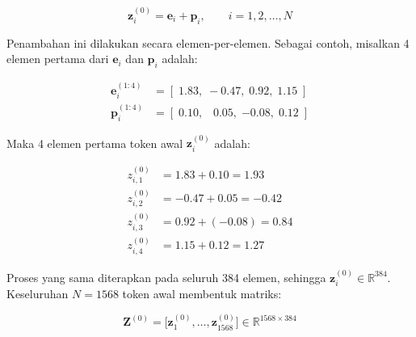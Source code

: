 \vspace{0.5cm}
\begin{equation}
  \mathbf{z}_i^{(0)} = \mathbf{e}_i + \mathbf{p}_i,
  \qquad i = 1,2,\ldots,N
\end{equation}
\vspace{0.5cm}
 
\noindent
Penambahan ini dilakukan secara elemen-per-elemen.
Sebagai contoh, misalkan 4 elemen pertama dari $\mathbf{e}_i$ dan
$\mathbf{p}_i$ adalah:
 
\vspace{0.5cm}
\begin{align*}
  \mathbf{e}_i^{(1:4)}   &= [\;1.83,\; -0.47,\; 0.92,\; 1.15\;] \\[4pt]
  \mathbf{p}_i^{(1:4)}   &= [\;0.10,\;\;\; 0.05,\; {-0.08},\; 0.12\;]
\end{align*}
\vspace{0.5cm}
 
\noindent
Maka 4 elemen pertama token awal $\mathbf{z}_i^{(0)}$ adalah:
 
\vspace{0.5cm}
\begin{align*}
  z_{i,1}^{(0)} &= 1.83 + 0.10 = \mathbf{1.93} \\[3pt]
  z_{i,2}^{(0)} &= -0.47 + 0.05 = \mathbf{-0.42} \\[3pt]
  z_{i,3}^{(0)} &= 0.92 + (-0.08) = \mathbf{0.84} \\[3pt]
  z_{i,4}^{(0)} &= 1.15 + 0.12 = \mathbf{1.27}
\end{align*}
\vspace{0.5cm}
 
\noindent
Proses yang sama diterapkan pada seluruh 384 elemen, sehingga
$\mathbf{z}_i^{(0)} \in \mathbb{R}^{384}$.
Keseluruhan $N=1568$ token awal membentuk matriks:
 
\vspace{0.5cm}
\begin{equation}
  \mathbf{Z}^{(0)}
  = \bigl[\mathbf{z}_1^{(0)},\ldots,\mathbf{z}_{1568}^{(0)}\bigr]
  \in \mathbb{R}^{1568\times384}
\end{equation}
\vspace{0.5cm}
 
